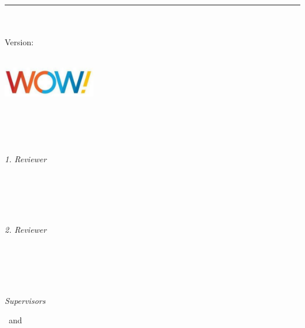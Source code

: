 %
\begin{titlepage}
	\flushright
	\hfill
	\vfill
	{\LARGE\specTitle\par}
	\rule[5pt]{\textwidth}{.4pt} \par
	\Large\firstAuthorName\\
	\vfill
	\textit{\large\reqDate}\\
	Version: \reqSpecVersion{}
\end{titlepage}


\begin{titlepage}
	\tgherosfont{}
	\centering

	{\Large \clientCompany} \\[4mm]
	\includegraphics[width=4cm]{gfx/wide_open_west_logo_white_bg} \\[2mm]
	\textsf{\clientCompanyGroup} \\
	\textsf{\clientCompanyDepartment} \\

	\vfill
	{\large \reqSubject} \\[5mm]
	{\LARGE \color{ctcolortitle}\textbf{\specTitle} \\[10mm]}

	\vfill
	\begin{minipage}[t]{.27\textwidth}
		\raggedleft{}
		\textit{1. Reviewer}
	\end{minipage}
	\hspace*{15pt}
	\begin{minipage}[t]{.65\textwidth}
		{\Large \firstReviewer} \\
		{\small \firstReviewerTitle} \\[-1mm]
		{\small \firstReviewerCompany}
	\end{minipage} \\[5mm]
	\begin{minipage}[t]{.27\textwidth}
		\raggedleft{}
		\textit{2. Reviewer}
	\end{minipage}
	\hspace*{15pt}
	\begin{minipage}[t]{.65\textwidth}
		{\Large \secondReviewer} \\
		{\small \secondReviewerTitle} \\[-1mm]
		{\small \secondReviewerCompany}
	\end{minipage} \\[10mm]
	\begin{minipage}[t]{.27\textwidth}
		\raggedleft{}
		\textit{Supervisors}
	\end{minipage}
	\hspace*{15pt}
	\begin{minipage}[t]{.65\textwidth}
		\firstSupervisor\ and \secondSupervisor{}
	\end{minipage} \\[10mm]


\end{titlepage}
